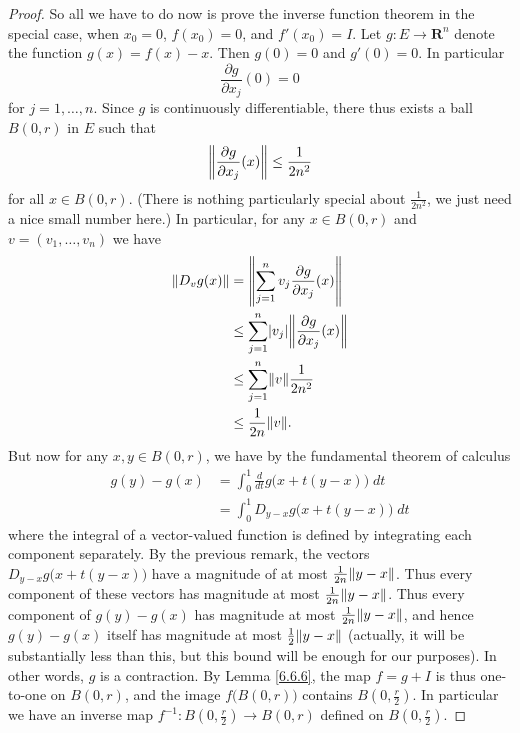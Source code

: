 \begin{proof}
    So all we have to do now is prove the inverse function theorem in the special case, when \(x_0 = 0\), \(f(x_0) = 0\), and \(f'(x_0) = I\).
    Let \(g : E \to \mathbf{R}^n\) denote the function \(g(x) = f(x) - x\).
    Then \(g(0) = 0\) and \(g'(0) = 0\).
    In particular
    \[
        \frac{\partial g}{\partial x_j}(0) = 0
    \]
    for \(j = 1, \dots, n\).
    Since \(g\) is continuously differentiable, there thus exists a ball \(B(0, r)\) in \(E\) such that
    \[
        \norm*{\frac{\partial g}{\partial x_j}(x)} \leq \frac{1}{2 n^2}
    \]
    for all \(x \in B(0, r)\).
    (There is nothing particularly special about \(\frac{1}{2 n^2}\), we just need a nice small number here.)
    In particular, for any \(x \in B(0, r)\) and \(v = (v_1, \dots, v_n)\) we have
    \begin{align*}
        \norm*{D_v g(x)} & = \norm*{\sum_{j = 1}^n v_j \frac{\partial g}{\partial x_j} (x)}          \\
                         & \leq \sum_{j = 1}^n \abs*{v_j} \norm*{\frac{\partial g}{\partial x_j}(x)} \\
                         & \leq \sum_{j = 1}^n \norm*{v} \frac{1}{2 n^2}                             \\
                         & \leq \frac{1}{2n} \norm*{v}.
    \end{align*}
    But now for any \(x, y \in B(0, r)\), we have by the fundamental theorem of calculus
    \begin{align*}
        g(y) - g(x) & = \int_0^1 \frac{d}{dt} g\big(x + t(y - x)\big) \; dt \\
                    & = \int_0^1 D_{y - x} g\big(x + t(y - x)\big) \; dt
    \end{align*}
    where the integral of a vector-valued function is defined by integrating each component separately.
    By the previous remark, the vectors \(D_{y - x} g\big(x + t(y - x)\big)\) have a magnitude of at most \(\frac{1}{2n} \norm*{y - x}\).
    Thus every component of these vectors has magnitude at most \(\frac{1}{2n} \norm*{y - x}\).
    Thus every component of \(g(y) - g(x)\) has magnitude at most \(\frac{1}{2n} \norm*{y - x}\), and hence \(g(y) - g(x)\) itself has magnitude at most \(\frac{1}{2} \norm*{y - x}\)
    (actually, it will be substantially less than this, but this bound will be enough for our purposes).
    In other words, \(g\) is a contraction.
    By Lemma \ref{6.6.6}, the map \(f = g + I\) is thus one-to-one on \(B(0, r)\), and the image \(f\big(B(0, r)\big)\) contains \(B(0, \frac{r}{2})\).
    In particular we have an inverse map \(f^{-1} : B(0, \frac{r}{2}) \to B(0, r)\) defined on \(B(0, \frac{r}{2})\).


\end{proof}
